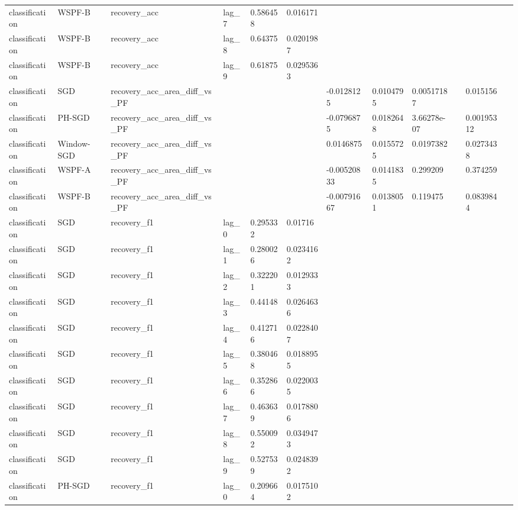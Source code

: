 \begin{tabular}{llllllllllll}
classification & WSPF-B & recovery\_acc & lag\_7 & 0.586458 & 0.016171 &  &  &  &  &  &  \\
classification & WSPF-B & recovery\_acc & lag\_8 & 0.64375 & 0.0201987 &  &  &  &  &  &  \\
classification & WSPF-B & recovery\_acc & lag\_9 & 0.61875 & 0.0295363 &  &  &  &  &  &  \\
classification & SGD & recovery\_acc\_area\_diff\_vs\_PF &  &  &  & -0.0128125 & 0.0104795 & 0.00517187 &  & 0.015156 &  \\
classification & PH-SGD & recovery\_acc\_area\_diff\_vs\_PF &  &  &  & -0.0796875 & 0.0182648 & 3.66278e-07 &  & 0.00195312 &  \\
classification & Window-SGD & recovery\_acc\_area\_diff\_vs\_PF &  &  &  & 0.0146875 & 0.0155725 & 0.0197382 &  & 0.0273438 &  \\
classification & WSPF-A & recovery\_acc\_area\_diff\_vs\_PF &  &  &  & -0.00520833 & 0.0141835 & 0.299209 &  & 0.374259 &  \\
classification & WSPF-B & recovery\_acc\_area\_diff\_vs\_PF &  &  &  & -0.00791667 & 0.0138051 & 0.119475 &  & 0.0839844 &  \\
classification & SGD & recovery\_f1 & lag\_0 & 0.295332 & 0.01716 &  &  &  &  &  &  \\
classification & SGD & recovery\_f1 & lag\_1 & 0.280026 & 0.0234162 &  &  &  &  &  &  \\
classification & SGD & recovery\_f1 & lag\_2 & 0.322201 & 0.0129333 &  &  &  &  &  &  \\
classification & SGD & recovery\_f1 & lag\_3 & 0.44148 & 0.0264636 &  &  &  &  &  &  \\
classification & SGD & recovery\_f1 & lag\_4 & 0.412716 & 0.0228407 &  &  &  &  &  &  \\
classification & SGD & recovery\_f1 & lag\_5 & 0.380468 & 0.0188955 &  &  &  &  &  &  \\
classification & SGD & recovery\_f1 & lag\_6 & 0.352866 & 0.0220035 &  &  &  &  &  &  \\
classification & SGD & recovery\_f1 & lag\_7 & 0.463639 & 0.0178806 &  &  &  &  &  &  \\
classification & SGD & recovery\_f1 & lag\_8 & 0.550092 & 0.0349473 &  &  &  &  &  &  \\
classification & SGD & recovery\_f1 & lag\_9 & 0.527539 & 0.0248392 &  &  &  &  &  &  \\
classification & PH-SGD & recovery\_f1 & lag\_0 & 0.209664 & 0.0175102 &  &  &  &  &  &  \\

\end{tabular}
